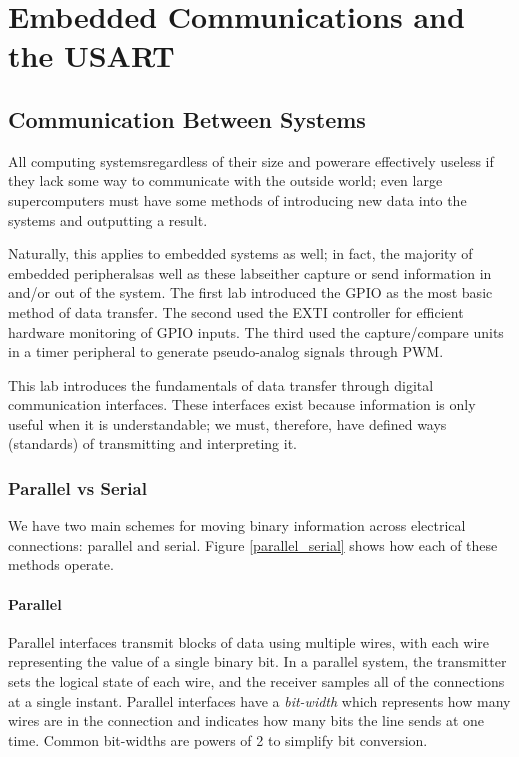 \documentclass[openany,11pt,fleqn]{book} %
\begin{document}
	
\chapter{Embedded Communications and the USART}

\section{Communication Between Systems}
All computing systems\textemdash regardless of their size and power\textemdash are effectively useless if they lack some way to communicate with the outside world; even large supercomputers must have some methods of introducing new data into the systems and outputting a result. 

Naturally, this applies to embedded systems as well; in fact, the majority of embedded peripherals\textemdash as well as these labs\textemdash either capture or send information in and/or out of the system. The first lab introduced the GPIO as the most basic method of data transfer. The second used the EXTI controller for efficient hardware monitoring of GPIO inputs. The third used the capture/compare units in a timer peripheral to generate pseudo-analog signals through PWM. 

This lab introduces the fundamentals of data transfer through digital communication interfaces. These interfaces exist because information is only useful when it is understandable; we must, therefore, have defined ways (standards) of transmitting and interpreting it.

\subsection{Parallel vs Serial}

We have two main schemes for moving binary information across electrical connections: parallel and serial. Figure \ref{parallel_serial} shows how each of these methods operate. 

\subsubsection{Parallel}
Parallel interfaces transmit blocks of data using multiple wires, with each wire representing the value of a single binary bit. In a parallel system, the transmitter sets the logical state of each wire, and the receiver samples all of the connections at a single instant. Parallel interfaces have a \textit{bit-width} which represents how many wires are in the connection and indicates how many bits the line sends at one time. Common bit-widths are powers of 2 to simplify bit conversion. 
\end{document}
